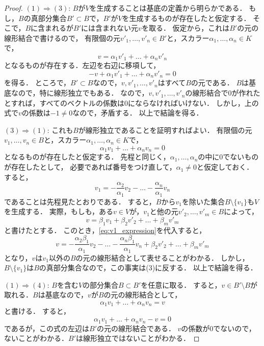 \begin{proof}
    $(1) \Rightarrow (3)$: $B$が$V$を生成することは基底の定義から明らかである．
    もし，$B$の真部分集合$B' \subset B$で，$B'$が$V$を生成するものが存在したと仮定する．
    そこで，$B$に含まれるが$B'$には含まれない元$v$を取る．
    仮定から，これは$B'$の元の線形結合で書けるので，
    有限個の元$v'_1,\dots,v'_n \in B'$と，スカラー$\alpha_1,\dots,\alpha_n \in K$で，
    \[
        v = \alpha_1 v'_1 + \dots + \alpha_n v'_n
    \]
    となるものが存在する．左辺を右辺に移項して，
    \[
        -v + \alpha_1 v'_1 + \dots + \alpha_n v'_n = 0
    \]
    を得る．
    ところで，$B' \subset B$なので，$v,v'_1,\dots,v'_n$はすべて$B$の元である．
    $B$は基底なので，特に線形独立でもある．
    なので，$v,v'_1,\dots,v'_n$の線形結合で0が作れたとすれば，すべてのベクトルの係数は0にならなければいけない．
    しかし，上の式で$v$の係数は$-1 \neq 0$なので，矛盾する．
    以上で結論を得る．
    
    $(3) \Rightarrow (1)$: これも$B$が線形独立であることを証明すればよい．
    有限個の元$v_1,\dots,v_n \in B$と，スカラー$\alpha_1,\dots,\alpha_n \in K$で，
    \[
        \alpha_1 v_1 + \dots + \alpha_n v_n = 0
    \]
    となるものが存在したと仮定する．
    先程と同じく，$\alpha_1,\dots,\alpha_n$の中に0でないものが存在したとして，
    必要であれば番号をつけ直して，$\alpha_1 \neq 0$と仮定しておく．
    すると，
    \begin{equation}\label{eq:v1_expression}
        v_1 = -\frac{\alpha_2}{\alpha_1} v_2 - \dots - \frac{\alpha_n}{\alpha_1} v_n
    \end{equation}
    であることは先程見たとおりである．
    すると，$B$から$v_1$を除いた集合$B \setminus \{v_1\}$も$V$を生成する．
    実際，もしも，ある$v \in V$が，$v_1$と他の元$v'_2,\dots,v'_m \in B$によって，
    \[
        v = \beta_1 v_1 + \beta_2 v'_2 + \dots + \beta_m v'_m
    \]
    と書けたとする．
    このとき，\eqref{eq:v1_expression}を代入すると，
    \[
        v = -\frac{\alpha_2\beta_1}{\alpha_1} v_2 - \dots - \frac{\alpha_n\beta_1}{\alpha_1} v_n + \beta_2 v'_2 + \dots + \beta_m v'_m
    \]
    となり，$v$は$v_1$以外の$B$の元の線形結合として表せることがわかる．
    しかし，$B \setminus \{v_1\}$は$B$の真部分集合なので，この事実は(3)に反する．
    以上で結論を得る．
    
    $(1) \Rightarrow (4)$:
    $B$を含む$V$の部分集合$B \subset B'$を任意に取る．
    すると，$v \in B' \setminus B$が取れる．$B$は基底なので，$v$が$B$の元の線形結合として，
    \[
        \alpha_1 v_1 + \dots + \alpha_n v_n = v
    \]
    と書ける．
    すると，
    \[
        \alpha_1 v_1 + \dots + \alpha_n v_n - v = 0
    \]
    であるが，この式の左辺は$B'$の元の線形結合である．
    $v$の係数が0でないので，ないことがわかる．$B'$は線形独立ではないことがわかる．
    

\end{proof}
